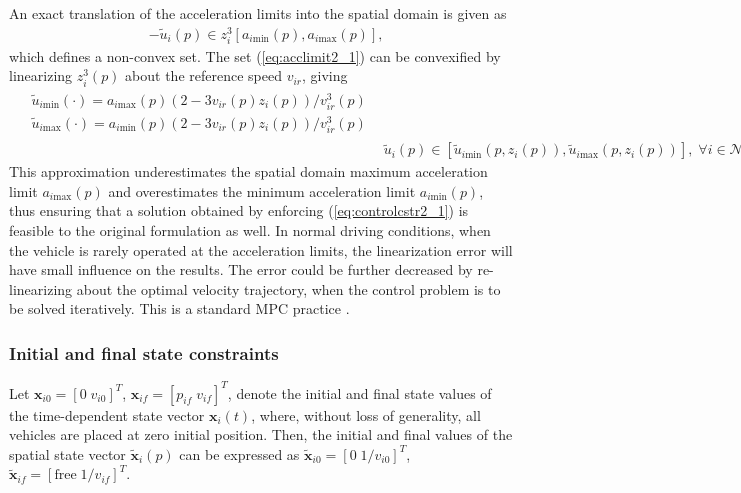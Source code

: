 \documentclass[letterpaper,10pt,conference]{ieeeconf}
\begin{document}
An exact translation of the acceleration limits into the spatial domain is given as
\begin{align} \label{eq:acclimit2_1}
&-\tilde u_i(p)\in z_i^3[a_{i\mathrm{min}}(p), a_{i\mathrm{max}}(p)],
\end{align}
which defines a non-convex set. The set (\ref{eq:acclimit2_1}) can be convexified by linearizing $z_i^3(p)$ about the reference speed $v_{ir}$, giving
\begin{align}
\begin{split} \label{eq:controlcstr2_2}
&\tilde u_{i\text{min}}(\cdot)=a_{i\text{max}}(p) \left(2 - 3 v_{ir}(p) z_i(p) \right)/v_{ir}^3(p)\\
&\tilde u_{i\text{max}}(\cdot)=a_{i\text{min}}(p) \left(2 - 3 v_{ir}(p) z_i(p) \right)/v_{ir}^3(p)
\end{split}\\
&\tilde u_i(p) \in [\tilde u_{i\text{min}}(p,z_i(p)), \tilde u_{i\text{max}}(p,z_i(p))], \; \forall i \in \mathcal{N}. \label{eq:controlcstr2_1}
\end{align}
This approximation underestimates the spatial domain maximum acceleration limit $a_{i\text{max}}(p)$ and overestimates the minimum acceleration limit $a_{i\text{min}}(p)$, thus ensuring that a solution obtained by enforcing (\ref{eq:controlcstr2_1}) is feasible to the original formulation as well. In normal driving conditions, when the vehicle is rarely operated at the acceleration limits, the linearization error will have small influence on the results. The error could be further decreased by re-linearizing about the optimal velocity trajectory, when the control problem is to be solved iteratively. This is a standard MPC practice \cite{mayne00}.

\subsubsection{Initial and final state constraints} Let \mbox{$\mathbf{x}_{i0}=[0 \; v_{i0}]^T$}, \mbox{$\mathbf{x}_{if}=[p_{if} \; v_{if}]^T$}, denote the initial and final state values of the time-dependent state vector $\mathbf{x}_i(t)$, where, without loss of generality, all vehicles are placed at zero initial position. Then, the initial and final values of the spatial state vector $\mathbf{\tilde x}_i(p)$ can be expressed as \mbox{$\mathbf{\tilde x}_{i0}=[0 \; 1/v_{i0}]^T$}, \mbox{$\mathbf{\tilde x}_{if}=[\text{free} \; 1/v_{if}]^T$}.
\end{document}
